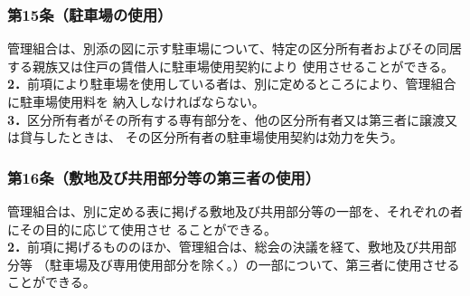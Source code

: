 \documentclass[
  luatex,
  paper=a4paper,
  fontsize=11pt,
  jafontsize=11pt,
  jlreq_notes,
]{jlreq}
\begin{document}
  \subsubsection*{第15条（駐車場の使用）}
  管理組合は、別添の図に示す駐車場について、特定の区分所有者およびその同居する親族又は住戸の賃借人に駐車場使用契約により
  使用させることができる。\\
  \textbf{2．}前項により駐車場を使用している者は、別に定めるところにより、管理組合に駐車場使用料を
  納入しなければならない。\\
  \textbf{3．}区分所有者がその所有する専有部分を、他の区分所有者又は第三者に譲渡又は貸与したときは、
  その区分所有者の駐車場使用契約は効力を失う。
  \subsubsection*{第16条（敷地及び共用部分等の第三者の使用）}
  管理組合は、別に定める表に掲げる敷地及び共用部分等の一部を、それぞれの者にその目的に応じて使用させ
  ることができる。\\
  \textbf{2．}前項に掲げるもののほか、管理組合は、総会の決議を経て、敷地及び共用部分等
  （駐車場及び専用使用部分を除く。）の一部について、第三者に使用させることができる。
\end{document}
